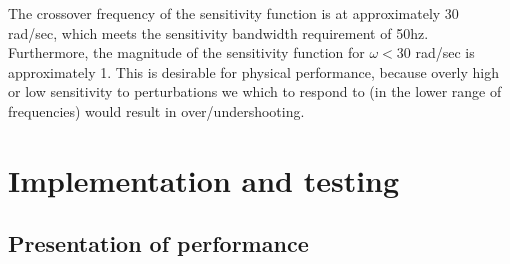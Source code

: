 \documentclass[11pt, a4paper,twocolumn]{article}
\begin{document}
			The crossover frequency of the sensitivity function is at approximately 30 rad/sec, which meets the sensitivity bandwidth requirement of 50hz. Furthermore, the magnitude of the sensitivity function for $ \omega < 30 $ rad/sec is approximately 1. This is desirable for physical performance, because overly high or low sensitivity to perturbations we which to respond to (in the lower range of frequencies) would result in over/undershooting.
			
			

	
    \section{Implementation and testing}\label{sec:test}
        \subsection{Presentation of performance}\label{subsec:performance}
\end{document}
